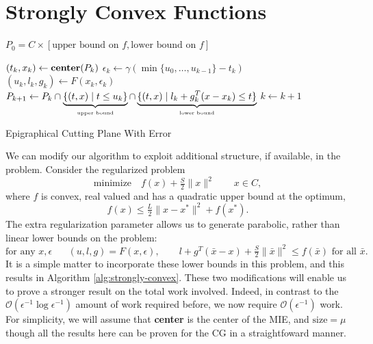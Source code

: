 
\section{Strongly Convex Functions}

\begin{algorithm} 
  \SetAlgoNoLine
  \DontPrintSemicolon
  $P_0 = C \times {[\mbox{upper bound on $f$}, \mbox{lower bound on $f$}]}$\;
  
   {
  \nl $(t_k,x_k) \gets \mbox{\bf center}(P_k)$\;
  \nl $\epsilon_k \gets \gamma (\min \{ u_0, \dots, u_{k-1}\}-t_k )$\;
  \nl $(u_k,l_k,g_k)\gets F(x_k, \epsilon_k )$\;
  \nl $P_{k+1}\gets P_k\cap 
      \underbrace{\{(t,x)\mid t\leq u_k \}}_{\mbox{\tiny upper bound}} \cap 
      \underbrace{\{(t,x)\mid l_k+g_k^{T}(x-x_k)\leq t\}}_{\mbox{\tiny lower bound}}$\;
  \vspace{-5mm}
  \nl $k \gets k+1$  
  }
  \caption{Epigraphical Cutting Plane With Error \label{alg:strongly-convex}}
\end{algorithm}

We can modify our algorithm to exploit additional structure, if available, in the problem. Consider the regularized problem
$$
\mbox{minimize}\quad  f(x) + \tfrac{S}{2}\|x\|^2  \qquad x\in C,
$$
where $f$ is convex, real valued and has a quadratic upper bound at the optimum,
\begin{equation}\label{ass:smooth}
f(x)\leq\tfrac{L}{2}\|x-x^*\|^2+f(x^*).
\end{equation}
The extra regularization parameter allows us to generate parabolic, rather than linear lower bounds on the problem: 
\[
\mbox{for any $x,\epsilon$ } \quad (u,l,g) = F(x,\epsilon),\qquad 
 l+ g^T (\bar{x}-x) +\tfrac{S}{2}\|\bar{x}\|^2 \leq f(\bar{x}) \mbox{ for all }\bar{x}.
\]
It is a simple matter to incorporate these lower bounds in this problem, and
this results in Algorithm \eqref{alg:strongly-convex}. These two modifications will enable us to prove a stronger result on the total
work involved. Indeed, in contrast to the
$\mathcal{O}(\epsilon^{-1}\log\epsilon^{-1})$ amount of work required before,
we now require $\mathcal{O}(\epsilon^{-1})$ work. For simplicity, we will assume that \mbox{\bf{center}} is the center of the MIE, and $\mbox{size}=\mu$ though all the results here can be proven for the CG in a straightfoward manner.

